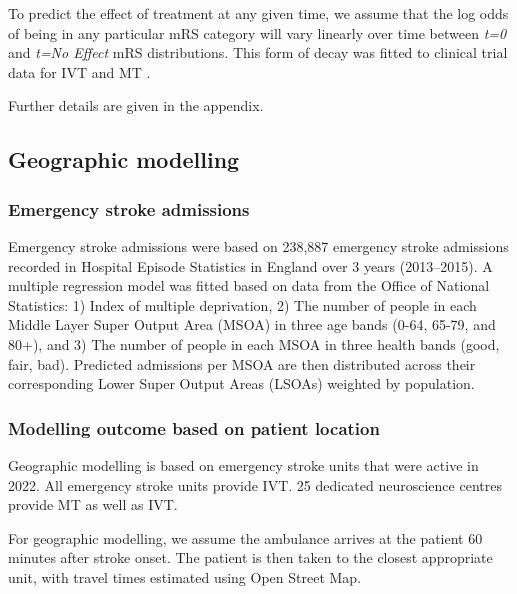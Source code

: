 \begin{multicols}{2}
To predict the effect of treatment at any given time, we assume that the log odds of being in any particular mRS category will vary linearly over time between \textit{t=0} and \textit{t=No Effect} mRS distributions. This form of decay was fitted to clinical trial data for IVT \cite{emberson_effect_2014} and MT \cite{fransen_time_2016}.

Further details are given in the appendix.

\subsection{Geographic modelling}

\subsubsection{Emergency stroke admissions}

Emergency stroke admissions were based on 238,887 emergency stroke admissions recorded in Hospital Episode Statistics in England over 3 years (2013–2015). A multiple regression model was fitted based on data from the Office of National Statistics: 1) Index of multiple deprivation, 2) The number of people in each Middle Layer Super Output Area (MSOA) in three age bands (0-64, 65-79, and 80+), and 3) The number of people in each MSOA in three health bands (good, fair, bad). Predicted admissions per MSOA are then distributed across their corresponding Lower Super Output Areas (LSOAs) weighted by population.

\subsubsection{Modelling outcome based on patient location}

Geographic modelling is based on emergency stroke units that were active in 2022. All emergency stroke units provide IVT. 25 dedicated neuroscience centres provide MT as well as IVT.

For geographic modelling, we assume the ambulance arrives at the patient 60 minutes after stroke onset. The patient is then taken to the closest appropriate unit, with travel times estimated using Open Street Map.

\end{multicols}

